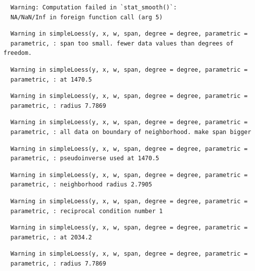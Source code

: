 \documentclass[12pt,twoside]{reedthesis}
\begin{document}
  \begin{verbatim}
  Warning: Computation failed in `stat_smooth()`:
  NA/NaN/Inf in foreign function call (arg 5)
  \end{verbatim}
  
  \begin{verbatim}
  Warning in simpleLoess(y, x, w, span, degree = degree, parametric =
  parametric, : span too small. fewer data values than degrees of freedom.
  \end{verbatim}
  
  \begin{verbatim}
  Warning in simpleLoess(y, x, w, span, degree = degree, parametric =
  parametric, : at 1470.5
  \end{verbatim}
  
  \begin{verbatim}
  Warning in simpleLoess(y, x, w, span, degree = degree, parametric =
  parametric, : radius 7.7869
  \end{verbatim}
  
  \begin{verbatim}
  Warning in simpleLoess(y, x, w, span, degree = degree, parametric =
  parametric, : all data on boundary of neighborhood. make span bigger
  \end{verbatim}
  
  \begin{verbatim}
  Warning in simpleLoess(y, x, w, span, degree = degree, parametric =
  parametric, : pseudoinverse used at 1470.5
  \end{verbatim}
  
  \begin{verbatim}
  Warning in simpleLoess(y, x, w, span, degree = degree, parametric =
  parametric, : neighborhood radius 2.7905
  \end{verbatim}
  
  \begin{verbatim}
  Warning in simpleLoess(y, x, w, span, degree = degree, parametric =
  parametric, : reciprocal condition number 1
  \end{verbatim}
  
  \begin{verbatim}
  Warning in simpleLoess(y, x, w, span, degree = degree, parametric =
  parametric, : at 2034.2
  \end{verbatim}
  
  \begin{verbatim}
  Warning in simpleLoess(y, x, w, span, degree = degree, parametric =
  parametric, : radius 7.7869
  \end{verbatim}
  
\end{document}
